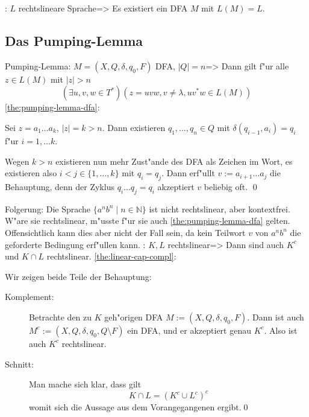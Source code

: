 \corollary: $L$ rechtslineare Sprache=>{
  Es existiert ein DFA $M$ mit $L(M)=L$.
  }
\subsection{Das Pumping-Lemma}
\lemma Pumping-Lemma:
  $M=(X,Q,\delta,q_0,F)$ DFA, $|Q|=n$=>{
  \label{the:pumping-lemma-dfa}
  Dann gilt f"ur alle $z\in L(M)$ mit $|z|>n$
  \[(\exists u,v,w\in T^*)(z=uvw,v\ne\lambda,uv^*w\in L(M))
    \]
  }
\proof \ref{the:pumping-lemma-dfa}:{
  Sei $z = a_1\ldots a_k$, $|z|=k>n$. Dann existieren $q_1,\ldots,q_n\in Q$ mit
  $\delta(q_{i-1},a_i)=q_i$ f"ur $i=1,\ldots k$. 
  
  Wegen $k>n$ existieren nun mehr Zust"ande des DFA als Zeichen im Wort, 
  es existieren also $i<j\in\{1,\ldots,k\}$ mit $q_i=q_j$. Dann erf"ullt 
  $v:=a_{i+1}\ldots a_j$ die Behauptung, denn der Zyklus $q_i\ldots q_j=q_i$ 
  akzeptiert $v$ beliebig oft.
  \qed
  }
\remark Folgerung:{
  Die Sprache $\{a^nb^n \mid n \in \mathbb{N}\}$ ist nicht rechtslinear, 
  aber kontextfrei. W"are sie rechtslinear, m"usste f"ur sie auch
  \ref{the:pumping-lemma-dfa} gelten. Offensichtlich kann dies aber
  nicht der Fall sein, da kein Teilwort $v$ von $a^nb^n$ die geforderte
  Bedingung erf"ullen kann.
  }
\theorem: $K,L$ rechtslinear=>{
  \label{the:linear-cap-compl}
  Dann sind auch $K^c$ und $K \cap L$ rechtslinear.
  }
\proof \ref{the:linear-cap-compl}:{
  Wir zeigen beide Teile der Behauptung:
  \begin{description}
    \item[Komplement:]
      Betrachte den zu $K$ geh"origen DFA
      $M:=(X,Q,\delta,q_0,F)$. Dann ist auch 
      $M^c:=(X,Q,\delta,q_0,Q\setminus F)$ ein DFA, und er akzeptiert genau
      $K^c$. Also ist auch $K^c$ rechtslinear.
    \item[Schnitt:]
      Man mache sich klar, dass gilt
      \[K\cap L=(K^c\cup L^c)^c
       	\]
      womit sich die Aussage aus dem Vorangegangenen ergibt.\qed
    \end{description}
  }
